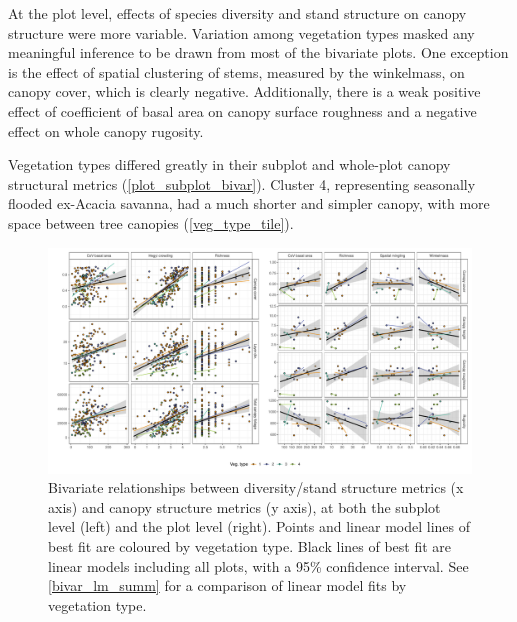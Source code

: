 \documentclass[11pt,a4paper]{article}
\begin{document}
At the plot level, effects of species diversity and stand structure on canopy structure were more variable. Variation among vegetation types masked any meaningful inference to be drawn from most of the bivariate plots. One exception is the effect of spatial clustering of stems, measured by the winkelmass, on canopy cover, which is clearly negative. Additionally, there is a weak positive effect of coefficient of basal area on canopy surface roughness and a negative effect on whole canopy rugosity. 

Vegetation types differed greatly in their subplot and whole-plot canopy structural metrics (\autoref{plot_subplot_bivar}). Cluster 4, representing seasonally flooded ex-Acacia savanna, had a much shorter and simpler canopy, with more space between tree canopies (\autoref{veg_type_tile}). 

\begin{landscape}
\begin{figure}
	\includegraphics[width=\linewidth]{bivar}
	\caption{Bivariate relationships between diversity/stand structure metrics (x axis) and canopy structure metrics (y axis), at both the subplot level (left) and the plot level (right). Points and linear model lines of best fit are coloured by vegetation type. Black lines of best fit are linear models including all plots, with a 95\% confidence interval. See \autoref{bivar_lm_summ} for a comparison of linear model fits by vegetation type.}
	\label{subplot_canopy_bivar}
\end{figure}
\end{landscape}
\end{document}
